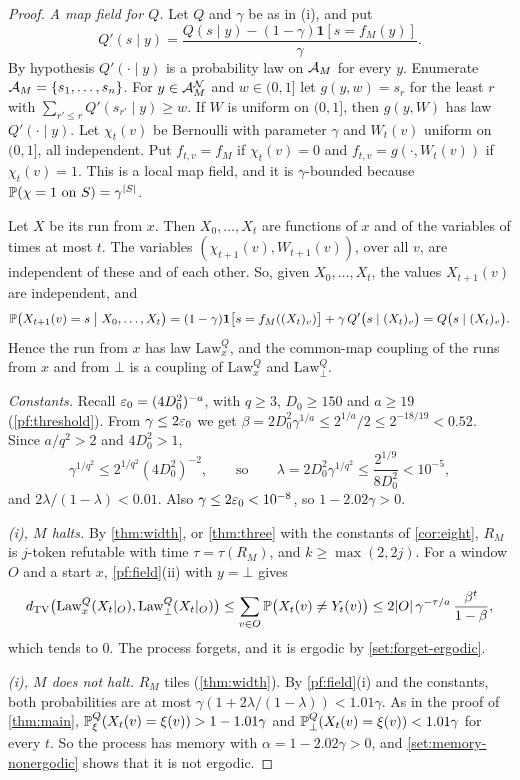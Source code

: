 \begin{proof}
\emph{A map field for $Q$.} Let $Q$ and $\gamma$ be as in (i), and put
\[
Q'(s\mid y)=\frac{Q(s\mid y)-(1-\gamma)\mathbf 1[s=f_M(y)]}{\gamma}.
\]
By hypothesis $Q'(\cdot\mid y)$ is a probability law on $\mathcal{A}_M$ for every $y$.
Enumerate $\mathcal{A}_M=\{s_1,\dots,s_n\}$. For $y\in\mathcal{A}_M^{\mathcal N}$ and $w\in(0,1]$ let
$g(y,w)=s_r$ for the least $r$ with $\sum_{r'\le r}Q'(s_{r'}\mid y)\ge w$. If $W$ is
uniform on $(0,1]$, then $g(y,W)$ has law $Q'(\cdot\mid y)$. Let $\chi_t(v)$ be
Bernoulli with parameter $\gamma$ and $W_t(v)$ uniform on $(0,1]$, all independent.
Put $f_{t,v}=f_M$ if $\chi_t(v)=0$ and $f_{t,v}=g(\cdot,W_t(v))$ if $\chi_t(v)=1$.
This is a local map field, and it is $\gamma$-bounded because
$\mathbb{P}(\chi=1\text{ on }S)=\gamma^{|S|}$.

Let $X$ be its run from $x$. Then $X_0,\dots,X_t$ are functions of $x$ and of the
variables of times at most $t$. The variables $(\chi_{t+1}(v),W_{t+1}(v))$, over all
$v$, are independent of these and of each other. So, given $X_0,\dots,X_t$, the
values $X_{t+1}(v)$ are independent, and
\[
\mathbb{P}\bigl(X_{t+1}(v)=s\bigm|X_0,\dots,X_t\bigr)
=(1-\gamma)\mathbf 1\bigl[s=f_M((X_t)_v)\bigr]+\gamma\,Q'\bigl(s\mid(X_t)_v\bigr)
=Q\bigl(s\mid(X_t)_v\bigr).
\]
Hence the run from $x$ has law $\mathrm{Law}^Q_x$, and the common-map coupling of the
runs from $x$ and from $\bot$ is a coupling of $\mathrm{Law}^Q_x$ and
$\mathrm{Law}^Q_\bot$.

\emph{Constants.} Recall $\varepsilon_0=(4D_0^2)^{-a}$, with $q\ge3$, $D_0\ge150$ and
$a\ge19$ (\cref{pf:threshold}). From $\gamma\le2\varepsilon_0$ we get
$\beta=2D_0^2\gamma^{1/a}\le2^{1/a}/2\le2^{-18/19}<0.52$. Since $a/q^2>2$ and
$4D_0^2>1$,
\[
\gamma^{1/q^2}\le2^{1/q^2}(4D_0^2)^{-2},\qquad\text{so}\qquad
\lambda=2D_0^2\gamma^{1/q^2}\le\frac{2^{1/9}}{8D_0^2}<10^{-5},
\]
and $2\lambda/(1-\lambda)<0.01$. Also $\gamma\le2\varepsilon_0<10^{-8}$, so
$1-2.02\gamma>0$.

\emph{(i), $M$ halts.} By \cref{thm:width}, or \cref{thm:three} with the constants
of \cref{cor:eight}, $R_M$ is $j$-token refutable with time $\tau=\tau(R_M)$, and
$k\ge\max(2,2j)$. For a window $O$ and a start $x$, \cref{pf:field}(ii) with $y=\bot$
gives
\[
d_{\mathrm{TV}}\bigl(\mathrm{Law}^Q_x(X_t|_O),\mathrm{Law}^Q_\bot(X_t|_O)\bigr)
\le\sum_{v\in O}\mathbb{P}\bigl(X_t(v)\ne Y_t(v)\bigr)
\le2|O|\,\gamma^{-\tau/a}\,\frac{\beta^t}{1-\beta},
\]
which tends to $0$. The process forgets, and it is ergodic by
\cref{set:forget-ergodic}.

\emph{(i), $M$ does not halt.} $R_M$ tiles (\cref{thm:width}). By
\cref{pf:field}(i) and the constants, both probabilities are at most
$\gamma(1+2\lambda/(1-\lambda))<1.01\gamma$. As in the proof of \cref{thm:main},
$\mathbb{P}^Q_\xi(X_t(v)=\xi(v))>1-1.01\gamma$ and
$\mathbb{P}^Q_\bot(X_t(v)=\xi(v))<1.01\gamma$ for every $t$. So the process has memory
with $\alpha=1-2.02\gamma>0$, and \cref{set:memory-nonergodic} shows that it is not
ergodic.


\end{proof}

